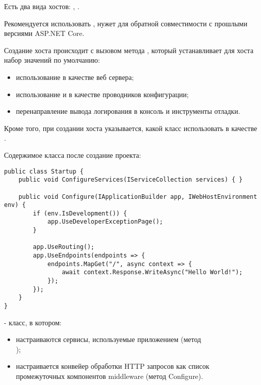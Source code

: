 \documentclass[a4paper,14pt]{extarticle}
\begin{document}
Есть два вида хостов: , .

Рекомендуется использовать ,  нужет для обратной совместимости с прошлыми версиями ASP.NET Core.

Создание хоста происходит с вызовом метода , который
устанавливает для хоста набор значений по умолчанию:

\begin{itemize}
    \item использование  в качестве веб сервера;
    \item использование  и
          в качестве проводников конфигурации;
    \item перенаправление вывода логирования в консоль и инструменты отладки.
\end{itemize}

Кроме того, при создании хоста указывается, какой класс использовать в качестве
.

Содержимое класса  после создание проекта:

\begin{lstlisting}
public class Startup {
    public void ConfigureServices(IServiceCollection services) { }

    public void Configure(IApplicationBuilder app, IWebHostEnvironment env) {
        if (env.IsDevelopment()) {
            app.UseDeveloperExceptionPage();
        }

        app.UseRouting();
        app.UseEndpoints(endpoints => {
            endpoints.MapGet("/", async context => {
                await context.Response.WriteAsync("Hello World!");
            });
        });
    }
}
\end{lstlisting}

 - класс, в котором:

\begin{itemize}
    \item настраиваются сервисы, используемые приложением (метод\\
          );
    \item настраивается конвейер обработки HTTP запросов как список
          промежуточных компонентов middleware (метод Configure).
\end{itemize}
\end{document}
